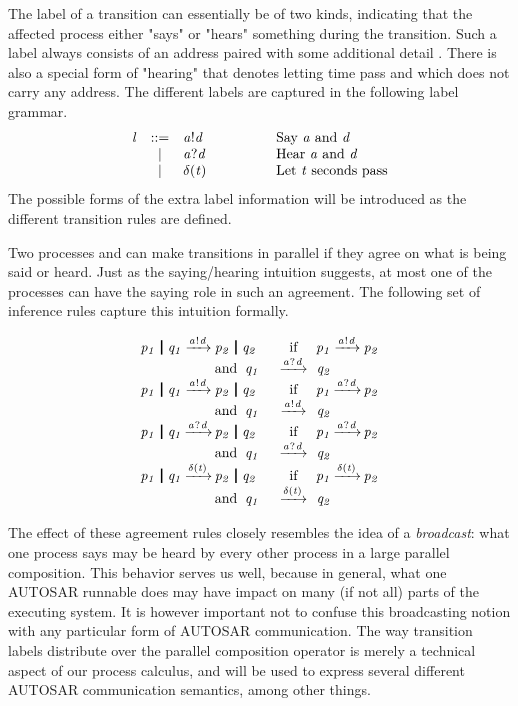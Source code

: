\documentclass[twocolumn]{article}
\begin{document}
The label  of a transition can essentially be of two kinds, indicating that the affected process either "says" or "hears" something during the transition. Such a label always consists of an address  paired with some additional detail . There is also a special form of "hearing" that denotes letting time pass and which does not carry any address. The different labels are captured in the following label grammar. 
\[
\begin{array}{rcll}
  \V{L}     & ::= & \V{A}!\V{D} 	& \hspace{4em}\text{Say  \V{A} and \V{D}} \\
            & |   & \V{A}?\V{D} 	& \hspace{4em}\text{Hear \V{A} and \V{D}} \\
            & |   & \Tdelta{\V{T}}	& \hspace{4em}\text{Let \V{T} seconds pass} \\
\end{array}
\]
The possible forms of the extra label information  will be introduced as the different transition rules are defined.

Two processes  and  can make transitions in parallel if they agree on what is being said or heard. Just as the saying/hearing intuition suggests, at most one of the processes can have the saying role in such an agreement. The following set of inference rules capture this intuition formally.
{
\renewcommand{\Prule}[2]{#1 & \Pif & #2\\}

\[ \begin{array}{@{}r@{}c@{}l@{\quad\;}c@{\;\,}r@{}c@{}l@{}r@{}c@{}l}  \CombRed  \end{array} \]
}


The effect of these agreement rules closely resembles the idea of a \emph{broadcast}: what one process says may be heard by every other process in a large parallel composition. This behavior serves us well, because in general, what one AUTOSAR runnable does may have impact on many (if not all) parts of the executing system. It is however important not to confuse this broadcasting notion with any particular form of AUTOSAR communication. The way transition labels distribute over the parallel composition operator is merely a technical aspect of our process calculus, and will be used to express several different AUTOSAR communication semantics, among other things.
\end{document}
